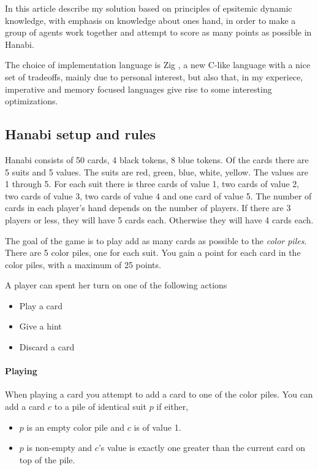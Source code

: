 In this article describe my solution based on principles of epsitemic dynamic knowledge, with emphasis on knowledge about ones hand, in order to make a group of agents work together and attempt to score as many points as possible in Hanabi. 

The choice of implementation language is Zig \cite{Ziglang}, a new C-like language with a nice set of tradeoffs, mainly due to personal interest, but also that, in my experiece, imperative and memory focused languages give rise to some interesting optimizations. 




\subsection{Hanabi setup and rules}
Hanabi consists of 50 cards, 4 black tokens, 8 blue tokens.  
Of the cards there are 5 suits and 5 values. 
The suits are red, green, blue, white, yellow. 
The values are 1 through 5. 
For each suit there is three cards of value 1, two cards of value 2, two cards of value 3, two cards of value 4 and one card of value 5.
The number of cards in each player's hand depends on the number of players. If there are 3 players or less, they will have 5 cards each. Otherwise they will have 4 cards each.

The goal of the game is to play add as many cards as possible to the \emph{color piles}. 
There are 5 color piles, one for each suit. You gain a point for each card in the color piles, with a maximum of 25 points.

A player can spent her turn on one of the following actions

\begin{itemize}
\item Play a card
\item Give a hint
\item Discard a card
\end{itemize}

\paragraph{Playing}
When playing a card you attempt to add a card to one of the color piles.
You can add a card $c$ to a pile of identical suit $p$ if either, 

\begin{itemize}	
\item $p$ is an empty color pile and $c$ is of value 1.
\item $p$ is non-empty and $c$'s value is exactly one greater than the current card on top of the pile.
\end{itemize}

